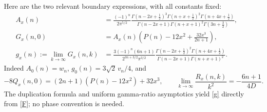 \documentclass[11pt,a4paper]{article}
\begin{document}
Here are the two relevant boundary expressions, with all constants fixed:
\begin{align}
 A_x(n)&=\frac{(-1)^n}{2\pi^{5/2}}
 \frac{\Gamma(n-2x+\tfrac12)^3\Gamma(n+x+\tfrac12)^2
 \Gamma(n+4x+\tfrac12)}
 {\Gamma(n-2x+1)\Gamma(n+x+1)^2\Gamma(3n+\tfrac32)},\label{Ax}\\
 G_x(n,0)&=A_x(n)\left(P(n)-12x^2+\frac{32x^3}{2n+1}\right),\label{G0}\\
 g_x(n):=\lim_{k\to\infty}G_x(n,k)
 &=\frac{3(-1)^n(6n+1)}{2^{3n+3/2}\pi^{3/2}}
 \frac{\Gamma(n-2x+\tfrac12)^2\Gamma(n+4x+\tfrac12)}
 {\Gamma(n-2x+1)\Gamma(n+x+1)^2}.\label{g}
\end{align}
Indeed $A_0(n)=w_n$, $g_0(n)=3\sqrt2\,v_n/4$, and
\[
 -8Q_x(n,0)=(2n+1)(P(n)-12x^2)+32x^3,\qquad
 \lim_{k\to\infty}\frac{R_x(n,k)}{k^2}=-\frac{6n+1}{4D}.
\]
The duplication formula and uniform gamma-ratio asymptotics yield
\eqref{g} directly from \eqref{F}; no phase convention is needed.
\end{document}
